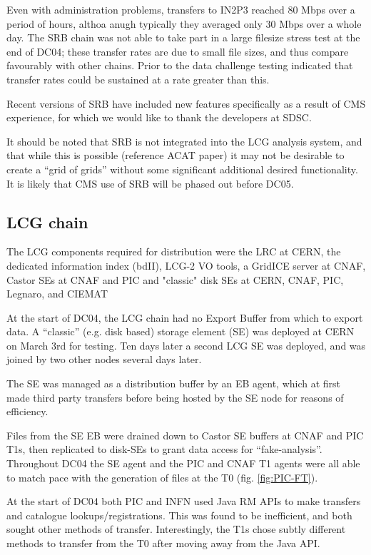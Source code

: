 \documentclass{cmspaper}
\begin{document}
Even with administration problems, transfers to IN2P3 reached 80 Mbps
over a period of hours, althoa anugh typically they averaged only 30
Mbps over a whole day. The SRB chain was not able to take part in a
large filesize stress test at the end of DC04; these transfer rates
are due to small file sizes, and thus compare favourably with other
chains. Prior to the data challenge testing indicated that transfer
rates could be sustained at a rate greater than this.

Recent versions of SRB have included new features specifically as a 
result of CMS experience, for which we would like to thank the developers
at SDSC.

It should be noted that SRB is not integrated into the LCG analysis
system, and that while this is possible (reference ACAT paper) it may
not be desirable to create a ``grid of grids'' without some
significant additional desired functionality.  It is likely that CMS
use of SRB will be phased out before DC05.



\subsection{LCG chain}
The LCG components required for distribution were the LRC at CERN, the
dedicated information index (bdII), LCG-2 VO tools, a GridICE server
at CNAF, Castor SEs at CNAF and PIC and "classic" disk SEs at CERN,
CNAF, PIC, Legnaro, and CIEMAT

At the start of DC04, the LCG chain had no Export Buffer from which to
export data. A ``classic'' (e.g. disk based) storage element (SE) was
deployed at CERN on March 3rd for testing. Ten days later a second LCG
SE was deployed, and was joined by two other nodes several days later.

The SE was managed as a distribution buffer by an EB agent, which at
first made third party transfers before being hosted by the SE node
for reasons of efficiency.

Files from the SE EB were drained down to Castor SE buffers at CNAF
and PIC T1s, then replicated to disk-SEs to grant data access for
``fake-analysis''. Throughout DC04 the SE agent and the PIC and CNAF
T1 agents were all able to match pace with the generation of files at
the T0 (fig. \ref{fig:PIC-FT}).

At the start of DC04 both PIC and INFN used Java RM APIs to make
transfers and catalogue lookups/registrations. This was found to be
inefficient, and both sought other methods of transfer. Interestingly,
the T1s chose subtly different methods to transfer from the T0 after
moving away from the Java API.
\end{document}
